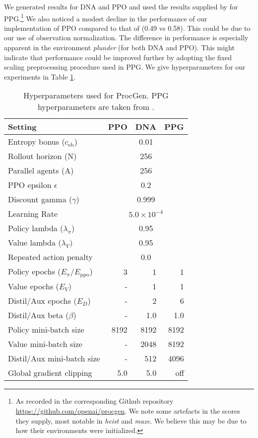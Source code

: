 \documentclass{article}
\begin{document}
We generated results for DNA and PPO and used the results supplied by \cite{cobbe2021phasic} for PPG.\footnote{As recorded in the corresponding Github repository \url{https://github.com/openai/procgen}. We note some artefacts in the scores they supply, most notable in \textit{heist} and \textit{maze}. We believe this may be due to how their environments were initialized.} We also noticed a modest decline in the performance of our implementation of PPO compared to that of \cite{cobbe2021phasic} (0.49 vs 0.58). This could be due to our use of observation normalization. The difference in performance is especially apparent in the environment \textit{plunder} (for both DNA and PPO). This might indicate that performance could be improved further by adopting the fixed scaling preprocessing procedure used in PPG. We give hyperparameters for our experiments in Table \ref{tab:procgen_hps}.

\begin{table}[h]
    \centering
    \caption{Hyperparameters used for ProcGen. PPG hyperparameters are taken from \cite{cobbe2021phasic}.}
    \begin{tabular}{l r r r }
    \toprule
        Setting & PPO & DNA & PPG \\
    \midrule
Entropy bonus ($c_\text{eb}$)   & \multicolumn{3}{c}{0.01}\\ 
        Rollout horizon (N)             & \multicolumn{3}{c}{256}\\ 
        Parallel agents (A)             & \multicolumn{3}{c}{256}\\ 
        PPO epsilon $\epsilon$          & \multicolumn{3}{c}{0.2}\\ 
        Discount gamma ($\gamma$)       & \multicolumn{3}{c}{0.999}\\ 
Learning Rate                   & \multicolumn{3}{c}{$5.0 \times 10^{-4}$}\\
        
        Policy lambda ($\lambda_\pi$)   & \multicolumn{3}{c}{0.95}\\ 
        Value lambda ($\lambda_V)$     & \multicolumn{3}{c}{0.95}\\  
        Repeated action penalty         & \multicolumn{3}{c}{0.0}\\ 
        \midrule
        Policy epochs ($E_\pi/E_\text{ppo}$)         & 3 & 1 & 1 \\
        Value epochs ($E_V$)            & - & 1 & 1 \\
        Distil/Aux epochs ($E_D$)       & - & 2 & 6 \\
        Distil/Aux beta ($\beta$)       & - & 1.0 & 1.0 \\
        
        Policy mini-batch size          & 8192 & 8192 & 8192 \\ 
        Value mini-batch size           & - & 2048    & 8192 \\
        Distil/Aux mini-batch size      & -  & 512    & 4096 \\
        Global gradient clipping        & 5.0 & 5.0 & off \\  
    \bottomrule
    \end{tabular}
    \label{tab:procgen_hps}
\end{table}
\end{document}
